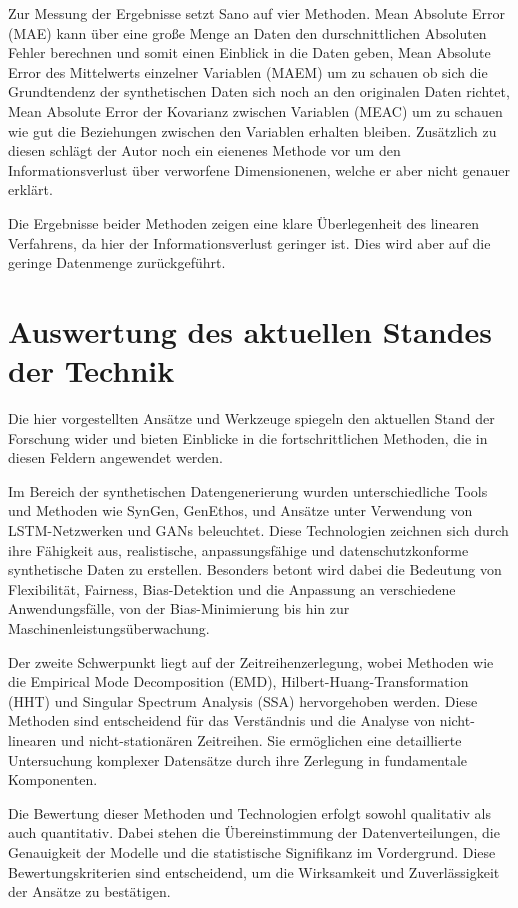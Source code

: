 Zur Messung der Ergebnisse setzt Sano auf vier Methoden. Mean Absolute Error (MAE) kann über eine große Menge an Daten den durschnittlichen Absoluten Fehler berechnen und somit einen Einblick in die Daten geben, Mean Absolute Error des Mittelwerts einzelner Variablen (MAEM) um zu schauen ob sich die Grundtendenz der synthetischen Daten sich noch an den originalen Daten richtet,
Mean Absolute Error der Kovarianz zwischen Variablen (MEAC) um zu schauen wie gut die Beziehungen zwischen den Variablen erhalten bleiben.
Zusätzlich zu diesen schlägt der Autor noch ein eienenes Methode vor um den Informationsverlust über verworfene Dimensionenen, welche er aber nicht genauer erklärt.

Die Ergebnisse beider Methoden zeigen eine klare Überlegenheit des linearen Verfahrens, da hier der Informationsverlust geringer ist. Dies wird aber auf die geringe Datenmenge zurückgeführt.



\section{Auswertung des aktuellen Standes der Technik}
Die hier vorgestellten Ansätze und Werkzeuge spiegeln den aktuellen Stand der Forschung wider und bieten Einblicke in die fortschrittlichen Methoden, die in diesen Feldern angewendet werden.

Im Bereich der synthetischen Datengenerierung wurden unterschiedliche Tools und Methoden wie SynGen, GenEthos, und Ansätze unter Verwendung von LSTM-Netzwerken und GANs beleuchtet. Diese Technologien zeichnen sich durch ihre Fähigkeit aus, realistische,
anpassungsfähige und datenschutzkonforme synthetische Daten zu erstellen. Besonders betont wird dabei die Bedeutung von Flexibilität, Fairness, Bias-Detektion und die Anpassung an verschiedene Anwendungsfälle,
von der Bias-Minimierung bis hin zur Maschinenleistungsüberwachung.

Der zweite Schwerpunkt liegt auf der Zeitreihenzerlegung, wobei Methoden wie die Empirical Mode Decomposition (EMD), Hilbert-Huang-Transformation (HHT) und Singular Spectrum Analysis (SSA) hervorgehoben werden.
Diese Methoden sind entscheidend für das Verständnis und die Analyse von nicht-linearen und nicht-stationären Zeitreihen. Sie ermöglichen eine detaillierte Untersuchung komplexer Datensätze durch ihre Zerlegung in fundamentale Komponenten.

Die Bewertung dieser Methoden und Technologien erfolgt sowohl qualitativ als auch quantitativ. Dabei stehen die Übereinstimmung der Datenverteilungen, die Genauigkeit der Modelle und die statistische Signifikanz im Vordergrund.
Diese Bewertungskriterien sind entscheidend, um die Wirksamkeit und Zuverlässigkeit der Ansätze zu bestätigen.